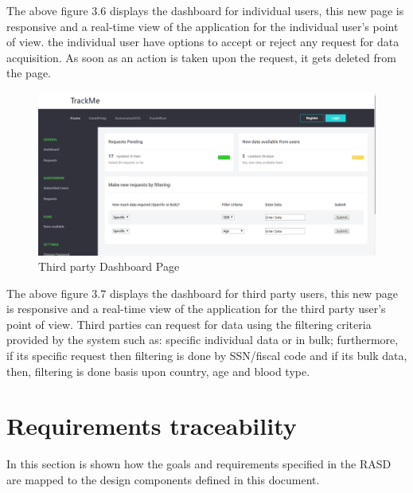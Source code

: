 \documentclass[a4paper, hidelinks, 12pt]{report}
\begin{document}
The above figure 3.6 displays the dashboard for individual users, this new page is responsive and a real-time view of the application for the individual user's point of view. the individual user have options to accept or reject any request for data acquisition. As soon as an action is taken upon the request, it gets deleted from the page.

	\begin{figure}[H]
		\centering
		\includegraphics[scale=0.35]{UI/db_thirdparty.png}
		\caption[UI: Third party Dashboard Page]{Third party Dashboard Page}
		\label{fig:Dashboard for individuals}
	\end{figure}
	The above figure 3.7 displays the dashboard for third party users, this new page is responsive and a real-time view of the application for the third party user's point of view. Third parties can  request for  data using the filtering criteria provided by the system such as: specific individual data or in bulk; furthermore, if its specific request then filtering is done by SSN/fiscal code and if its bulk data, then, filtering is done basis upon country, age and blood type.
	
	\chapter{Requirements traceability}
	In this section is shown how the goals and requirements specified in the RASD are mapped to the design components defined in this document.
	
\end{document}
